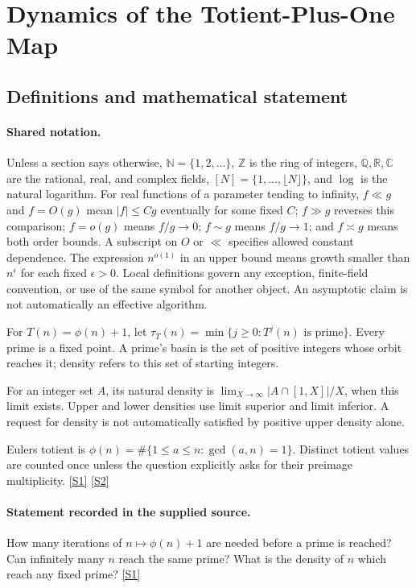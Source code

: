 \documentclass[11pt,a4paper]{article}
\newcommand{\N}{\mathbb{N}}
\newcommand{\Z}{\mathbb{Z}}
\newcommand{\Q}{\mathbb{Q}}
\newcommand{\R}{\mathbb{R}}
\newcommand{\C}{\mathbb{C}}
\newcommand{\sref}[2]{\hyperlink{source:#1:#2}{[S#2]}}
\begin{document}
\section{Dynamics of the Totient-Plus-One Map}\label{statement}


\subsection{Definitions and mathematical statement}

\paragraph{Shared notation.}Unless a section says otherwise, $\N=\{1,2,\ldots\}$,
$\Z$ is the ring of integers, $\Q,\R,\C$ are the rational, real, and complex
fields, $[N]=\{1,\ldots,\lfloor N\rfloor\}$, and $\log$ is the natural
logarithm. For real functions of a parameter tending to infinity,
$f\ll g$ and $f=O(g)$ mean $|f|\leq Cg$ eventually for some fixed $C$;
$f\gg g$ reverses this comparison; $f=o(g)$ means $f/g\to0$;
$f\sim g$ means $f/g\to1$; and $f\asymp g$ means both order bounds.
A subscript on $O$ or $\ll$ specifies allowed constant dependence.
The expression $n^{o(1)}$ in an upper bound means growth smaller than
$n^\epsilon$ for each fixed $\epsilon>0$. Local definitions govern any
exception, finite-field convention, or use of the same symbol for another
object. An asymptotic claim is not automatically an effective algorithm.



For $T(n)=\phi(n)+1$, let $\tau_T(n)=\min\{j\geq0:T^j(n)\text{ is prime}\}$. Every prime is a fixed point. A prime's basin is the set of positive integers whose orbit reaches it; density refers to this set of starting integers.

For an integer set $A$, its natural density is $\lim_{X\to\infty}|A\cap[1,X]|/X$, when this limit exists. Upper and lower densities use limit superior and limit inferior. A request for density is not automatically satisfied by positive upper density alone.

Euler\textquotesingle s totient is $\phi(n)=\#\{1\leq a\leq n:\gcd(a,n)=1\}$. Distinct totient values are counted once unless the question explicitly asks for their preimage multiplicity. \sref{statement}{1} \sref{statement}{2}

\paragraph{Statement recorded in the supplied source.}
How many iterations of $n\mapsto \phi(n)+1$ are needed before a prime is reached? Can infinitely many $n$ reach the same prime? What is the density of $n$ which reach any fixed prime? \sref{statement}{1}
\end{document}
